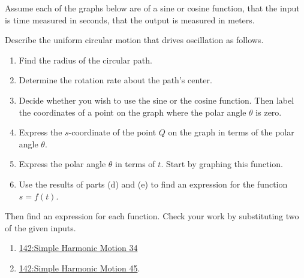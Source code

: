 \documentclass{ximera}
\begin{document}
\begin{exercise} \label{ELDKFeef}
Assume each of the graphs below are of a sine or cosine function, that the input is time measured in seconds, that the output is measured in meters.

Describe the uniform circular motion that drives oscillation as follows.
 
\begin{enumerate}
\item Find the radius of the circular path.

\item Determine the rotation rate about the path's center.

\item Decide whether you wish to use the sine or the cosine function. Then label the coordinates of a point on the graph where the polar angle $\theta$ is zero.

\item Express the $s$-coordinate of the point $Q$ on the graph in terms of the polar angle $\theta$.

\item Express the polar angle $\theta$ in terms of $t$. Start by graphing this function.

\item Use the results of parts (d) and (e) to find an expression for the function $s=f(t)$.



\end{enumerate}

Then find an expression for each function. Check your work by substituting two of the given inputs.


\begin{enumerate}

\item \href{https://www.desmos.com/calculator/4f6673ba8a}{142:Simple Harmonic Motion 34}



 
\begin{onlineOnly}
    \begin{center}
\end{center}
\end{onlineOnly}


\item 

\href{https://www.desmos.com/calculator/ust9xnjjaz}{142:Simple Harmonic Motion 45}.


\end{enumerate}
\end{exercise}
\end{document}
